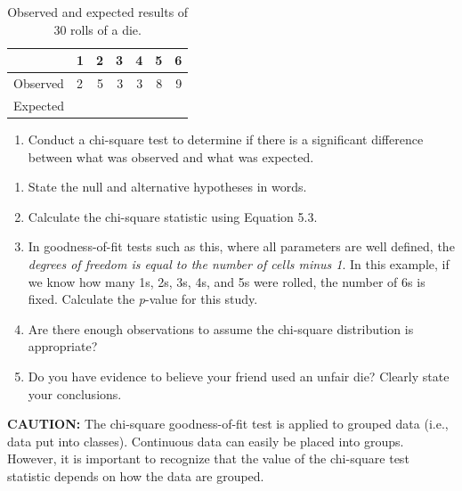 \documentclass[
]{report}
\providecommand{\tightlist}{%
  \setlength{\itemsep}{0pt}\setlength{\parskip}{0pt}}
\begin{document}
\begin{table}[!h]
\centering
\caption{\label{tab:tab8} Observed and expected results of 30 rolls of a die.}
\centering
\begin{tabular}[t]{llrrrrr}
\toprule
  & 1 & 2 & 3 & 4 & 5 & 6\\
\midrule
Observed & 2 & 5 & 3 & 3 & 8 & 9\\
Expected &  &  &  &  &  & \\
\bottomrule
\end{tabular}
\end{table}

\begin{enumerate}
\def\labelenumi{\arabic{enumi}.}
\setcounter{enumi}{33}
\tightlist
\item
  Conduct a chi-square test to determine if there is a significant difference between what was observed and what was expected.\\
\end{enumerate}

\begin{enumerate}
\def\labelenumi{\alph{enumi}.}
\tightlist
\item
  State the null and alternative hypotheses in words.\\
\item
  Calculate the chi-square statistic using Equation 5.3.\\
\item
  In goodness-of-fit tests such as this, where all parameters are well defined, the \emph{degrees of freedom is equal to the number of cells minus 1}. In this example, if we know how many 1s, 2s, 3s, 4s, and 5s were rolled, the number of 6s is fixed. Calculate the \emph{p}-value for this study.\\
\item
  Are there enough observations to assume the chi-square distribution is appropriate?\\
\item
  Do you have evidence to believe your friend used an unfair die? Clearly state your conclusions.
\end{enumerate}

\large

\textbf{CAUTION:}
The chi-square goodness-of-fit test is applied to grouped data (i.e., data put into classes). Continuous data can easily be placed into groups. However, it is important to recognize that the value of the chi-square test statistic depends on how the data are grouped.
\normalsize
\end{document}
